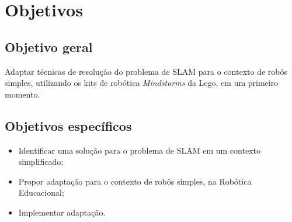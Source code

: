 	\section{Objetivos}

	\subsection{Objetivo geral} %
	\label{sub:objetivos_gerais}
	
		Adaptar técnicas de resolução do problema de SLAM para o contexto de robôs simples, utilizando os kits de robótica \textit{Mindstorms} da Lego, em um primeiro momento.


	\subsection{Objetivos específicos} %
	\label{sub:objetivos_específicos}
		 
	\begin{itemize}
		\item Identificar uma solução para o problema de SLAM em um contexto simplificado;
		\item Propor adaptação para o contexto de robôs simples, na Robótica Educacional;
		\item Implementar adaptação.
	\end{itemize}
	

